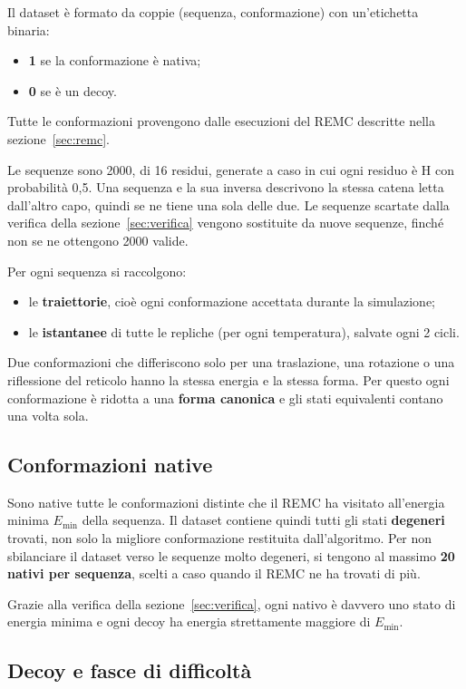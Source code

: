 \documentclass[11pt,a4paper]{article}
\newcommand{\Emin}{E_{\min}}
\begin{document}
Il dataset è formato da coppie (sequenza, conformazione) con un'etichetta binaria:
\begin{itemize}
  \item \textbf{1} se la conformazione è nativa;
  \item \textbf{0} se è un decoy.
\end{itemize}
Tutte le conformazioni provengono dalle esecuzioni del REMC descritte nella sezione~\ref{sec:remc}.

Le sequenze sono 2000, di 16 residui, generate a caso in cui ogni residuo è H con probabilità 0,5. Una sequenza e la sua inversa descrivono la stessa catena letta dall'altro capo, quindi se ne tiene una sola delle due. Le sequenze scartate dalla verifica della sezione~\ref{sec:verifica} vengono sostituite da nuove sequenze, finché non se ne ottengono 2000 valide.

Per ogni sequenza si raccolgono:
\begin{itemize}
  \item le \textbf{traiettorie}, cioè ogni conformazione accettata durante la simulazione;
  \item le \textbf{istantanee} di tutte le repliche (per ogni temperatura), salvate ogni 2 cicli.
\end{itemize}

Due conformazioni che differiscono solo per una traslazione, una rotazione o una riflessione del reticolo hanno la stessa energia e la stessa forma. Per questo ogni conformazione è ridotta a una \textbf{forma canonica} e gli stati equivalenti contano una volta sola.

\subsection{Conformazioni native}
\label{sec:nativi}

Sono native tutte le conformazioni distinte che il REMC ha visitato all'energia minima $\Emin$ della sequenza. Il dataset contiene quindi tutti gli stati \textbf{degeneri} trovati, non solo la migliore conformazione restituita dall'algoritmo. Per non sbilanciare il dataset verso le sequenze molto degeneri, si tengono al massimo \textbf{20 nativi per sequenza}, scelti a caso quando il REMC ne ha trovati di più.

Grazie alla verifica della sezione~\ref{sec:verifica}, ogni nativo è davvero uno stato di energia minima e ogni decoy ha energia strettamente maggiore di $\Emin$.

\subsection{Decoy e fasce di difficoltà}
\label{sec:fasce}
\end{document}
